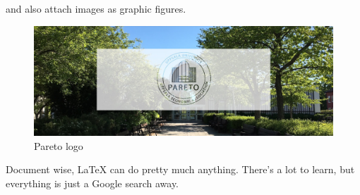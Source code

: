 \documentclass{article}[12pt]
\begin{document}
        and also attach images as graphic figures.
        \begin{figure}[H]
            \centering
            \includegraphics[width=\textwidth]{attachments/0-pareto.jpg}
            \caption{Pareto logo}
        \end{figure}
        
        Document wise, \LaTeX{} can do pretty much anything. There's a lot to learn, but everything is just a Google search away.
        
\end{document}
